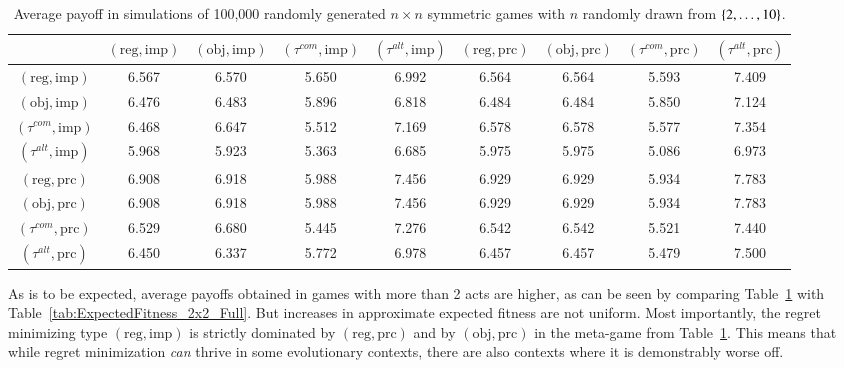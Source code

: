 \documentclass[fleqn,reqno,11pt]{article}
\begin{document}
\begin{table}[]
\centering
\footnotesize
\begin{tabular}{ccccccccc}
  \toprule
 & $(\text{reg}, \text{imp})$ 
 & $(\text{obj}, \text{imp})$ 
 & $(\tau^{com}, \text{imp})$
 & $(\tau^{alt}, \text{imp})$
 & $(\text{reg}, \text{prc})$ 
 & $(\text{obj}, \text{prc})$ 
 & $(\tau^{com}, \text{prc})$
 & $(\tau^{alt}, \text{prc})$ \\ 
  \midrule
  $(\text{reg}, \text{imp})$ & 6.567 & 6.570 & 5.650 & 6.992 & 6.564 & 6.564 & 5.593 & 7.409 \\
  $(\text{obj}, \text{imp})$ & 6.476 & 6.483 & 5.896 & 6.818 & 6.484 & 6.484 & 5.850 & 7.124 \\
  $(\tau^{com}, \text{imp})$ & 6.468 & 6.647 & 5.512 & 7.169 & 6.578 & 6.578 & 5.577 & 7.354 \\
  $(\tau^{alt}, \text{imp})$ & 5.968 & 5.923 & 5.363 & 6.685 & 5.975 & 5.975 & 5.086 & 6.973 \\
  $(\text{reg}, \text{prc})$ & 6.908 & 6.918 & 5.988 & 7.456 & 6.929 & 6.929 & 5.934 & 7.783 \\
  $(\text{obj}, \text{prc})$ & 6.908 & 6.918 & 5.988 & 7.456 & 6.929 & 6.929 & 5.934 & 7.783 \\
  $(\tau^{com}, \text{prc})$ & 6.529 & 6.680 & 5.445 & 7.276 & 6.542 & 6.542 & 5.521 & 7.440 \\
  $(\tau^{alt}, \text{prc})$ & 6.450 & 6.337 & 5.772 & 6.978 & 6.457 & 6.457 & 5.479 & 7.500 \\
   \bottomrule                         
\end{tabular}                      
\caption{Average payoff in simulations of 100,000
  randomly generated $n \times n$ symmetric games with $n$ randomly drawn from $\left\{2, \dots, 10\right\}$.}
\label{tab:ExpectedFitness_10x10}        
\end{table}

As is to be expected, average payoffs obtained in games with more than 2 acts are higher, as
can be seen by comparing Table~\ref{tab:ExpectedFitness_10x10} with
Table~\ref{tab:ExpectedFitness_2x2_Full}. But increases in approximate expected fitness are not
uniform. Most importantly, the regret minimizing type $(\text{reg}, \text{imp})$ is
strictly dominated by $(\text{reg}, \text{prc})$ and by $(\text{obj}, \text{prc})$ in
the meta-game from Table~\ref{tab:ExpectedFitness_10x10}. This means that while regret
minimization \emph{can} thrive in some evolutionary contexts, there are also contexts where it
is demonstrably worse off.
\end{document}
